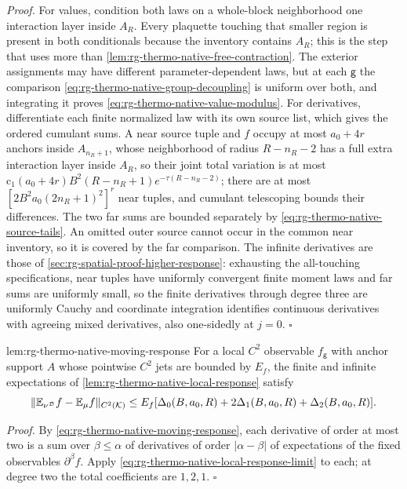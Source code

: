 \noindent\emph{Proof.}
For values, condition both laws on a whole-block neighborhood one interaction
layer inside $A_R$. Every plaquette touching that smaller region is present
in both conditionals because the inventory contains $A_R$; this is the step
that uses more than \cref{lem:rg-thermo-native-free-contraction}. The
exterior assignments may have different parameter-dependent laws, but at each
$\mathsf g$ the comparison \cref{eq:rg-thermo-native-group-decoupling} is
uniform over both, and integrating it proves
\cref{eq:rg-thermo-native-value-modulus}. For derivatives, differentiate each
finite normalized law with its own source list, which gives the ordered
cumulant sums. A near source tuple and $f$ occupy at most $a_0+4r$ anchors
inside $A_{n_R+1}$, whose neighborhood of radius $R-n_R-2$ has a full extra
interaction layer inside $A_R$, so their joint total variation is at most
$\mathrm c_1(a_0+4r)B^2(R-n_R+1)e^{-\tau(R-n_R-2)}$; there are at most
$[2B^2a_0(2n_R+1)^2]^r$ near tuples, and cumulant telescoping bounds their
differences. The two far sums are bounded separately by
\cref{eq:rg-thermo-native-source-tails}. An omitted outer source cannot occur
in the common near inventory, so it is covered by the far comparison. The
infinite derivatives are those of \cref{sec:rg-spatial-proof-higher-response}:
exhausting the all-touching specifications, near tuples have uniformly
convergent finite moment laws and far sums are uniformly small, so the finite
derivatives through degree three are uniformly Cauchy and coordinate
integration identifies continuous derivatives with agreeing mixed
derivatives, also one-sidedly at $j=0$. $\square$

{lem:rg-thermo-native-moving-response}
For a local $C^2$ observable $f_{\mathsf g}$ with anchor support $A$ whose
pointwise $C^2$ jets are bounded by $E_f$, the finite and infinite
expectations of \cref{lem:rg-thermo-native-local-response} satisfy
\begin{equation}
 \|\mathbb E_{\nu^{\mathfrak D}}f-\mathbb E_\mu f\|_{C^2(\mathcal K)}
 \le E_f[\Delta_0(B,a_0,R)+2\Delta_1(B,a_0,R)+\Delta_2(B,a_0,R)].
 \label{eq:rg-thermo-native-moving-comparison}
\end{equation}

\noindent\emph{Proof.}
By \cref{eq:rg-thermo-native-moving-response}, each derivative of order at
most two is a sum over $\beta\le\alpha$ of derivatives of order
$|\alpha-\beta|$ of expectations of the fixed observables $\partial^\beta f$.
Apply \cref{eq:rg-thermo-native-local-response-limit} to each; at degree two
the total coefficients are $1,2,1$. $\square$

